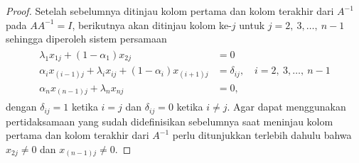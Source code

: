 \begin{proof}
    Setelah sebelumnya ditinjau kolom pertama dan kolom terakhir dari $A^{-1}$ pada $AA^{-1}=I$, berikutnya akan ditinjau kolom ke-$j$ untuk $j=2,~3,\dots,~n-1$ sehingga diperoleh sistem persamaan
    \begin{align}
    \begin{split}
        \lambda_1x_{1j} + (1 - \alpha_1)x_{2j} &= 0\\
        \alpha_ix_{(i-1)j} + \lambda_ix_{ij} + (1 - \alpha_i)x_{(i+1)j} &= \delta_{ij}, \quad i=2,~3,\dots,~n-1 \label{3.36}\\
        \alpha_nx_{(n-1)j} + \lambda_nx_{nj} &= 0,
    \end{split}
    \end{align}
    dengan $\delta_{ij} = 1$ ketika $i=j$ dan $\delta_{ij} = 0$ ketika $i \neq j$. Agar dapat menggunakan pertidaksamaan yang sudah didefinisikan sebelumnya saat meninjau kolom pertama dan kolom terakhir dari $A^{-1}$ perlu ditunjukkan terlebih dahulu bahwa $x_{2j} \neq 0$ dan $x_{(n-1)j} \neq 0$.
    

\end{proof}
